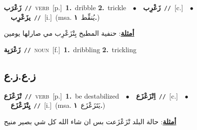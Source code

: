 \documentclass[10pt,a4paper,twoside]{article} %
\begin{document}
\begin{multicols}{2}
{\setlength\topsep{0pt}\textbf{\foreignlanguage{arabic}{زَعْرَب}}\ {\color{gray}\texttt{//}\color{black}}\ \textsc{verb}\ [p.]\ \textbf{1.}~dribble  \textbf{2.}~trickle\ \ $\bullet$\ \ \setlength\topsep{0pt}\textbf{\foreignlanguage{arabic}{زَعْرِب}}\ {\color{gray}\texttt{//}\color{black}}\ [c.]\ \ $\bullet$\ \ \setlength\topsep{0pt}\textbf{\foreignlanguage{arabic}{يزَعْرِب}}\ {\color{gray}\texttt{//}\color{black}}\ [i.]\ \color{gray}(msa. \foreignlanguage{arabic}{يُنقِّط}~\foreignlanguage{arabic}{\textbf{١.}})\color{black}\  \begin{flushright}\color{gray}\foreignlanguage{arabic}{\textbf{\underline{\foreignlanguage{arabic}{أمثلة}}}: حنفية المطبخ بِتْزَعْرِب مي صارلها يومين}\end{flushright}\color{black}} \vspace{2mm}

{\setlength\topsep{0pt}\textbf{\foreignlanguage{arabic}{زَعْرَبِة}}\ {\color{gray}\texttt{//}\color{black}}\ \textsc{noun}\ [f.]\ \textbf{1.}~dribbling  \textbf{2.}~trickling\ } \vspace{2mm}

\vspace{-3mm}
\subsection*{\color{blue}\foreignlanguage{arabic}{ز.ع.ز.ع}\color{blue}{}} 

{\setlength\topsep{0pt}\textbf{\foreignlanguage{arabic}{تْزَعْزَع}}\ {\color{gray}\texttt{//}\color{black}}\ \textsc{verb}\ [p.]\ \textbf{1.}~be destabilized\ \ $\bullet$\ \ \setlength\topsep{0pt}\textbf{\foreignlanguage{arabic}{اِتْزَعْزَع}}\ {\color{gray}\texttt{//}\color{black}}\ [c.]\ \ $\bullet$\ \ \setlength\topsep{0pt}\textbf{\foreignlanguage{arabic}{يِتْزَعْزَع}}\ {\color{gray}\texttt{//}\color{black}}\ [i.]\ \color{gray}(msa. \foreignlanguage{arabic}{يَتَزَعْزَع}~\foreignlanguage{arabic}{\textbf{١.}})\color{black}\  \begin{flushright}\color{gray}\foreignlanguage{arabic}{\textbf{\underline{\foreignlanguage{arabic}{أمثلة}}}: حالة البلد تْزَعْزَعت بس ان شاء الله كل شي بصير منيح}\end{flushright}\color{black}} \vspace{2mm}


\end{multicols}
\end{document}
